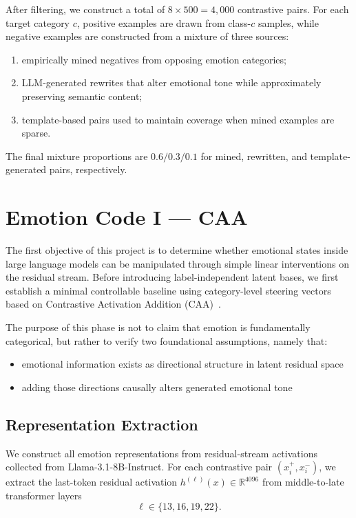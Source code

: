 \documentclass[12pt,twoside]{report}
\begin{document}
After filtering, we construct a total of
$8 \times 500 = 4{,}000$ contrastive pairs.
For each target category $c$, positive examples are drawn from
class-$c$ samples, while negative examples are constructed from a mixture
of three sources:

\begin{enumerate}
    \item empirically mined negatives from opposing emotion categories;
    \item LLM-generated rewrites that alter emotional tone while
    approximately preserving semantic content;
    \item template-based pairs used to maintain coverage when mined
    examples are sparse.
\end{enumerate}

The final mixture proportions are
$0.6/0.3/0.1$ for mined, rewritten, and template-generated pairs,
respectively.

\section{Emotion Code I --- CAA}

The first objective of this project is to determine whether emotional
states inside large language models can be manipulated through simple
linear interventions on the residual stream. Before introducing
label-independent latent bases, we first establish a minimal controllable
baseline using category-level steering vectors based on Contrastive
Activation Addition (CAA)~\cite{caa}.

The purpose of this phase is not to claim that emotion is fundamentally
categorical, but rather to verify two foundational assumptions, namely that:

\begin{itemize}
    \item emotional information exists as directional structure in latent
    residual space
    \item adding those directions causally alters generated emotional tone
\end{itemize}

\subsection{Representation Extraction}
\label{sec:emotion_code:caa:representation}

We construct all emotion representations from residual-stream activations
collected from Llama-3.1-8B-Instruct. For each contrastive pair
$(x_i^+, x_i^-)$, we extract the last-token residual activation
$h^{(\ell)}(x)\in\mathbb{R}^{4096}$ from middle-to-late transformer
layers
\[
\ell \in \{13,16,19,22\}.
\]
\end{document}

